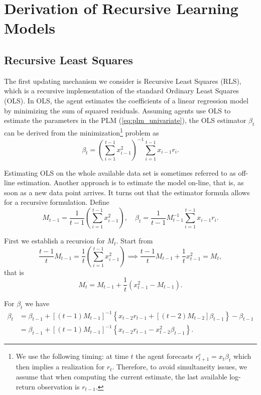 \section{Derivation of Recursive Learning Models}\label{sec:appendix_learning}
\subsection{Recursive Least Squares}\label{app:RLS}

The first updating mechanism we consider is Recursive Least Squares (RLS), which is a recursive implementation of the standard Ordinary Least Squares (OLS).
In OLS, the agent estimates the coefficients of a linear regression model by minimizing the sum of squared residuals.
Assuming agents use OLS to estimate the parameters in the PLM (\ref{eq:plm_univariate}), the OLS estimator $\beta_t$ can be derived from the minimization\footnote{
We use the following timing:
at time $t$ the agent forecasts $r^e_{t+1} = x_t \beta_{t}$ which then implies a realization for $r_t$. 
Therefore, to avoid simultaneity issues, we assume that when computing the current estimate, the last available log-return observation is $r_{t-1}$.
} problem as
\begin{equation}
     \beta_t = \left(\sum^{t-1}_{i=1}  x_{i-1}^2 \right)^{-1} \sum^{t-1}_{i=1}  x_{i-1} r_i.
\end{equation}

Estimating OLS on the whole available data set is sometimes referred to as off-line estimation. 
Another approach is to estimate the model on-line, that is, as soon as a new data point arrives. 
It turns out that the estimator formula allows for a recursive formulation.
Define 
\begin{equation}
M_{t-1} = \frac{1}{t-1}  \left(\sum^{t-1}_{i=1}  x_{i-1}^2 \right), \quad \beta_t = \frac{1}{t-1} M^{-1}_{t-1} \sum^{t-1}_{i=1}  x_{i-1} r_i.
\end{equation}

First we establish a recursion for $M_t$. Start from 
\begin{equation}
\frac{t-1}{t} M_{t-1} = \frac{1}{t}  \left(\sum^{t-1}_{i=1}  x_{i-1}^2 \right) \implies \frac{t-1}{t} M_{t-1} + \frac{1}{t} x_{t-1}^2 = M_t,
\end{equation}
that is
\begin{equation}
    M_t = M_{t-1} + \frac{1}{t} \left(x_{t-1}^2 - M_{t-1} \right).
\end{equation}

For $\beta_t$ we have
\begin{equation}\label{eq:b_t_evolution}
    \begin{aligned}
        \beta_t & = \beta_{t-1} + \left[(t-1) M_{t-1} \right]^{-1} \left\{ x_{t-2} r_{t-1} + \left[(t-2) M_{t-2} \right] \beta_{t-1} \right\} - \beta_{t-1} \\
        & = \beta_{t-1} + \left[(t-1) M_{t-1} \right]^{-1} \left\{ x_{t-2} r_{t-1} - x_{t-2}^2 \beta_{t-1} \right\}.
    \end{aligned}
\end{equation}

